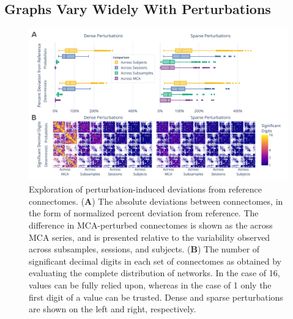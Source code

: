 \documentclass[fleqn,10pt]{SelfArx} %
\newcommand{\new}[1]{{\color{blue} #1}}
\begin{document}
\subsection*{Graphs Vary Widely With Perturbations}
\begin{figure}[hbt]\centering
\includegraphics[width=0.98\linewidth]{figures/fig1_absolute_differences.pdf}
\caption{Exploration of perturbation-induced deviations from reference connectomes.
(\textbf{A}) The absolute deviations \new{between connectomes}, in the form of normalized percent deviation from
reference. \new{The difference in MCA-perturbed connectomes is} shown as the across MCA series, \new{and is presented}
relative to \new{the variability observed} across subsamples, sessions, and subjects.
(\textbf{B}) The number of significant decimal digits in each set of connectomes as obtained \new{by} evaluating the
\new{complete distribution of networks}. In the case of 16, values can be fully relied upon, whereas in the case of 1 only the first
digit of a value can be trusted. \new{Dense} and \new{sparse} perturbations are shown on the left and right, respectively.}
\label{fig:absolute}
\end{figure}
\end{document}
